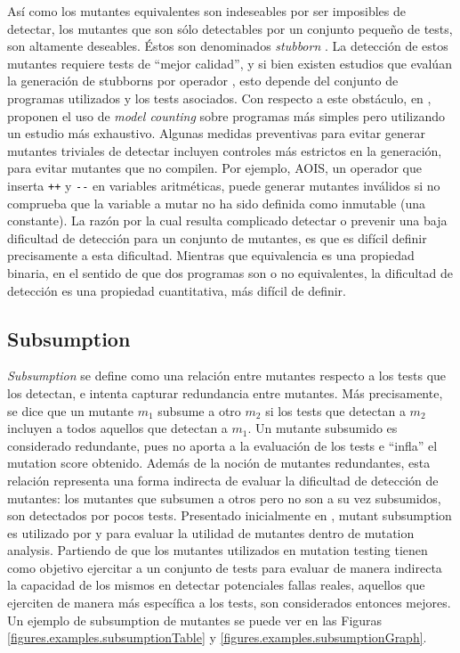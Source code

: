 As\'i como los mutantes equivalentes son indeseables por ser imposibles de detectar, los mutantes que son s\'olo detectables por un conjunto peque\~no de tests, son altamente deseables. \'Estos son denominados \emph{stubborn} \cite{bibliography.mutation.evaluation.stubbornHieronsHD99}. La detecci\'on de estos mutantes requiere tests de ``mejor calidad'', y si bien existen estudios que eval\'uan la generaci\'on de stubborns por operador \cite{bibliography.mutation.evaluation.stubborn}, esto depende del conjunto de programas utilizados y los tests asociados. Con respecto a este obst\'aculo, en \cite{bibliography.mutation.evaluation.hardnessVisser}, proponen el uso de \emph{model counting} sobre programas m\'as simples pero utilizando un estudio m\'as exhaustivo. Algunas medidas preventivas para evitar generar mutantes triviales de detectar incluyen controles m\'as estrictos en la generaci\'on, para evitar mutantes que no compilen. Por ejemplo, AOIS, un operador que inserta \lstinline|++| y \lstinline|--| en variables aritm\'eticas, puede generar mutantes inv\'alidos si no comprueba que la variable a mutar no ha sido definida como inmutable (una constante). La raz\'on por la cual resulta complicado detectar o prevenir una baja dificultad de detecci\'on para un conjunto de mutantes, es que es dif\'icil definir precisamente a esta dificultad. Mientras que equivalencia es una propiedad binaria, en el sentido de que dos programas son o no equivalentes, la dificultad de detecci\'on es una propiedad cuantitativa, m\'as dif\'icil de definir. 


\subsection{Subsumption}

\emph{Subsumption} se define como una relaci\'on entre mutantes respecto a los tests que los detectan, e intenta capturar redundancia entre mutantes. M\'as precisamente, se dice que un mutante $m_1$ subsume a otro $m_2$ si los tests que detectan a $m_2$ incluyen a todos aquellos que detectan a $m_1$. Un mutante subsumido es considerado redundante, pues no aporta a la evaluaci\'on de los tests e ``infla'' el mutation score obtenido. Adem\'as de la noci\'on de mutantes redundantes, esta relaci\'on representa una forma indirecta de evaluar la dificultad de detecci\'on de mutantes: los mutantes que subsumen a otros pero no son a su vez subsumidos, son detectados por pocos tests. Presentado inicialmente en \cite{bibliography.mutation.selection.Offutt96}, mutant subsumption es utilizado por \cite{bibliography.mutation.minimizing.dynamicsubsumption} y \cite{bibliography.mutation.evaluation.JustKA17} para evaluar la utilidad de mutantes dentro de mutation analysis. Partiendo de que los mutantes utilizados en mutation testing tienen como objetivo ejercitar a un conjunto de tests para evaluar de manera indirecta la capacidad de los mismos en detectar potenciales fallas reales, aquellos que ejerciten de manera m\'as espec\'ifica a los tests, son considerados entonces mejores. Un ejemplo de subsumption de mutantes se puede ver en las Figuras \ref{figures.examples.subsumptionTable} y \ref{figures.examples.subsumptionGraph}.

